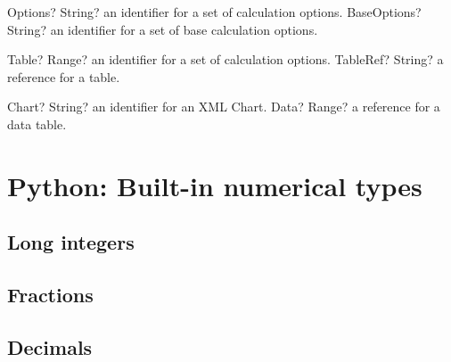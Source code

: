 \documentclass[12pt,a4paper,openany]{book}
\begin{document}
\begin{mpFunctionsExtract}
\mpFunctionOne
{Options? String?  an identifier for a set of calculation options.}
{BaseOptions? String? an identifier for a set of base calculation options.}
\end{mpFunctionsExtract}

\begin{mpFunctionsExtract}
\mpFunctionOne
{Table? Range?  an identifier for a set of calculation options.}
{TableRef? String? a reference for a table.}
\end{mpFunctionsExtract}

\begin{mpFunctionsExtract}
\mpFunctionOne
{Chart? String?  an identifier for an XML Chart.}
{Data? Range? a reference for a data table.}
\end{mpFunctionsExtract}

\chapter{Python: Built-in numerical types}

\section{Long integers}

\section{Fractions}

\section{Decimals}
\end{document}
